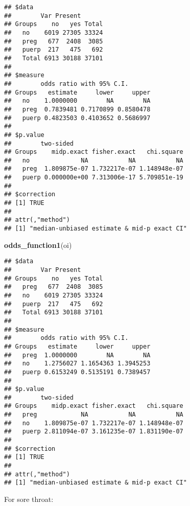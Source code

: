 \documentclass[
]{article}
\newenvironment{Shaded}{\begin{snugshade}}{\end{snugshade}}
\newcommand{\DataTypeTok}[1]{\textcolor[rgb]{0.13,0.29,0.53}{#1}}
\newcommand{\KeywordTok}[1]{\textcolor[rgb]{0.13,0.29,0.53}{\textbf{#1}}}
\newcommand{\NormalTok}[1]{#1}
\newcommand{\OperatorTok}[1]{\textcolor[rgb]{0.81,0.36,0.00}{\textbf{#1}}}
\newcommand{\OtherTok}[1]{\textcolor[rgb]{0.56,0.35,0.01}{#1}}
\newcommand{\StringTok}[1]{\textcolor[rgb]{0.31,0.60,0.02}{#1}}
\begin{document}
\begin{verbatim}
## $data
##        Var Present
## Groups    no   yes Total
##   no    6019 27305 33324
##   preg   677  2408  3085
##   puerp  217   475   692
##   Total 6913 30188 37101
## 
## $measure
##        odds ratio with 95% C.I.
## Groups   estimate     lower     upper
##   no    1.0000000        NA        NA
##   preg  0.7839481 0.7170899 0.8580478
##   puerp 0.4823503 0.4103652 0.5686997
## 
## $p.value
##        two-sided
## Groups    midp.exact fisher.exact   chi.square
##   no              NA           NA           NA
##   preg  1.809875e-07 1.732217e-07 1.148948e-07
##   puerp 0.000000e+00 7.313006e-17 5.709851e-19
## 
## $correction
## [1] TRUE
## 
## attr(,"method")
## [1] "median-unbiased estimate & mid-p exact CI"
\end{verbatim}

\begin{Shaded}
\begin{Highlighting}[]
\KeywordTok{odds_function1}\NormalTok{(oi)}
\end{Highlighting}
\end{Shaded}

\begin{verbatim}
## $data
##        Var Present
## Groups    no   yes Total
##   preg   677  2408  3085
##   no    6019 27305 33324
##   puerp  217   475   692
##   Total 6913 30188 37101
## 
## $measure
##        odds ratio with 95% C.I.
## Groups   estimate     lower     upper
##   preg  1.0000000        NA        NA
##   no    1.2756027 1.1654363 1.3945253
##   puerp 0.6153249 0.5135191 0.7389457
## 
## $p.value
##        two-sided
## Groups    midp.exact fisher.exact   chi.square
##   preg            NA           NA           NA
##   no    1.809875e-07 1.732217e-07 1.148948e-07
##   puerp 2.811094e-07 3.161235e-07 1.831190e-07
## 
## $correction
## [1] TRUE
## 
## attr(,"method")
## [1] "median-unbiased estimate & mid-p exact CI"
\end{verbatim}

For sore throat:

\begin{Shaded}
\end{Shaded}
\end{document}
